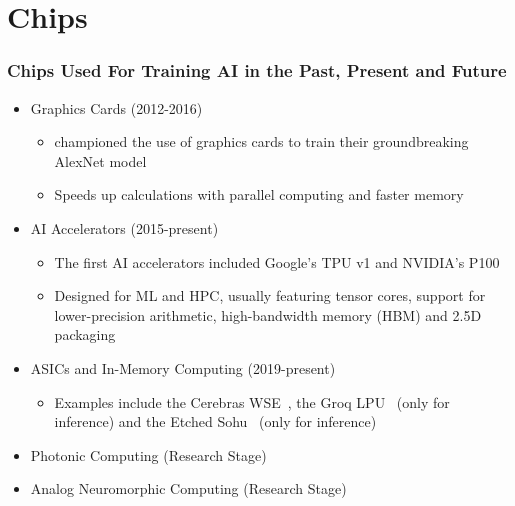 \documentclass[aspectratio=169]{beamer}
\begin{document}
    \section{Chips}
    \begin{frame}
        \frametitle{Chips Used For Training AI in the Past, Present and Future}
        \begin{itemize}
            \item Graphics Cards (2012-2016)
            \begin{itemize}
                \item \textcite{NIPS2012_c399862d} championed the use of graphics cards to train their groundbreaking AlexNet model
                \item Speeds up calculations with parallel computing and faster memory
            \end{itemize}
            \item AI Accelerators (2015-present)
            \begin{itemize}
                \item The first AI accelerators included Google's TPU v1 and NVIDIA's P100
                \item Designed for ML and HPC, usually featuring tensor cores, support for lower-precision arithmetic, high-bandwidth memory (HBM) and 2.5D packaging
            \end{itemize}
            \item ASICs and In-Memory Computing (2019-present)
            \begin{itemize}
                \item Examples include the Cerebras WSE~\parencite{cerebras_wse_3_2024}, the Groq LPU~\parencite{groq_groqrack_2024} (only for inference) and the Etched Sohu~\parencite{etched_announcement_2024} (only for inference)
            \end{itemize}
            \item Photonic Computing (Research Stage)
            \item Analog Neuromorphic Computing (Research Stage)
        \end{itemize}
    \end{frame}
\end{document}
